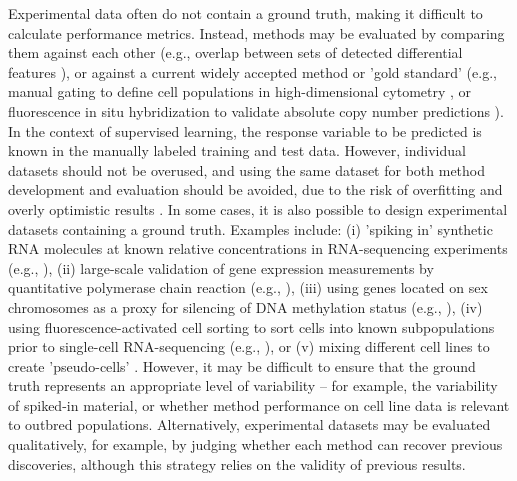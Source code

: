 Experimental data often do not contain a ground truth, making it difficult to calculate performance metrics. Instead, methods may be evaluated by comparing them against each other (e.g., overlap between sets of detected differential features \cite{nowicka_drimseqdirichletmultinomialframework_2016}), or against a current widely accepted method or 'gold standard' (e.g., manual gating to define cell populations in high-dimensional cytometry \cite{weber_comparisonclusteringmethods_2016, aghaeepour_criticalassessmentautomated_2013}, or fluorescence in situ hybridization to validate absolute copy number predictions \cite{zheng_benchmarkingcontextsdetails_2017}). In the context of supervised learning, the response variable to be predicted is known in the manually labeled training and test data. However, individual datasets should not be overused, and using the same dataset for both method development and evaluation should be avoided, due to the risk of overfitting and overly optimistic results \cite{grimm_evaluationtoolsused_2015,jelizarow_overoptimismbioinformaticsillustration_2010}. In some cases, it is also possible to design experimental datasets containing a ground truth. Examples include: (i) 'spiking in' synthetic RNA molecules at known relative concentrations \cite{jiang_syntheticspikeinstandards_2011} in RNA-sequencing experiments (e.g., \cite{seqc_comprehensiveassessmentrnaseq_2014,garalde_highlyparalleldirect_2018}), (ii) large-scale validation of gene expression measurements by quantitative polymerase chain reaction (e.g., \cite{seqc_comprehensiveassessmentrnaseq_2014}), (iii) using genes located on sex chromosomes as a proxy for silencing of DNA methylation status (e.g., \cite{law_voomprecisionweights_2014,fang_genomiclandscapehuman_2012}), (iv) using fluorescence-activated cell sorting to sort cells into known subpopulations prior to single-cell RNA-sequencing (e.g., \cite{soneson_biasrobustnessscalability_2018, schaum_singlecelltranscriptomics20_2018, zheng_massivelyparalleldigital_2017}), or (v) mixing different cell lines to create 'pseudo-cells' \cite{tian_benchmarkingsinglecell_2019}. However, it may be difficult to ensure that the ground truth represents an appropriate level of variability -- for example, the variability of spiked-in material, or whether method performance on cell line data is relevant to outbred populations. Alternatively, experimental datasets may be evaluated qualitatively, for example, by judging whether each method can recover previous discoveries, although this strategy relies on the validity of previous results.

